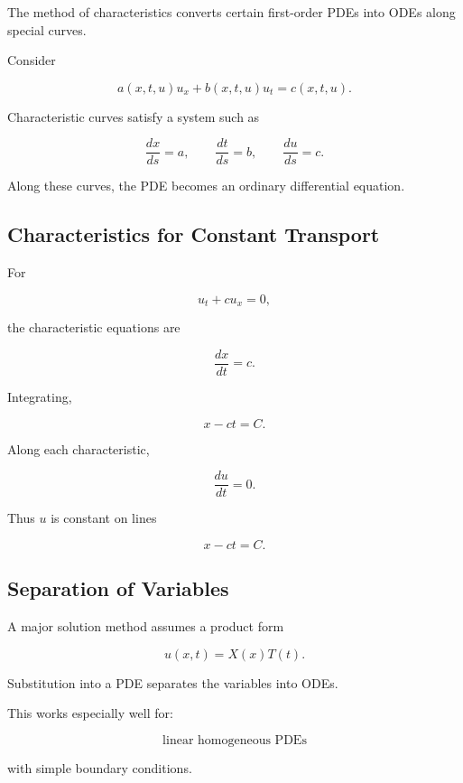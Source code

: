 The method of characteristics converts certain first-order PDEs into ODEs
along special curves.

Consider

\[
\boxed{
a(x,t,u)u_x
+
b(x,t,u)u_t
=
c(x,t,u).
}
\]

Characteristic curves satisfy a system such as

\[
\boxed{
\frac{dx}{ds}=a,
\qquad
\frac{dt}{ds}=b,
\qquad
\frac{du}{ds}=c.
}
\]

Along these curves, the PDE becomes an ordinary differential equation.

\subsection{Characteristics for Constant Transport}
\label{subsec:transport-characteristics}

For

\[
u_t+cu_x=0,
\]

the characteristic equations are

\[
\boxed{
\frac{dx}{dt}=c.
}
\]

Integrating,

\[
\boxed{
x-ct=C.
}
\]

Along each characteristic,

\[
\boxed{
\frac{du}{dt}=0.
}
\]

Thus \(u\) is constant on lines

\[
x-ct=C.
\]

\subsection{Separation of Variables}
\label{subsec:pde-separation-variables}

A major solution method assumes a product form

\[
\boxed{
u(x,t)
=
X(x)T(t).
}
\]

Substitution into a PDE separates the variables into ODEs.

This works especially well for:

\[
\boxed{
\text{linear homogeneous PDEs}
}
\]

with simple boundary conditions.


